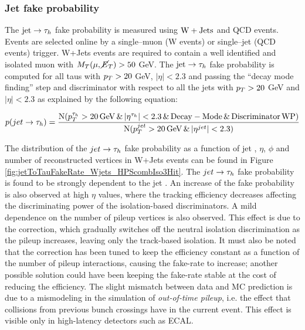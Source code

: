 \subsubsection{Jet fake probability}

The $\mathrm{jet} \rightarrow \tau_h$ fake probability is measured using $\mathrm{W}+\mathrm{Jets}$ and QCD events. Events are selected online by a single--muon (W events) or single--jet (QCD events) trigger. W+Jets events are required to contain a well identified and isolated muon with $M_T(\mu, \cancel{E}_T) > 50$ GeV. The $\mathrm{jet} \rightarrow \tau_h$ fake probability is computed for all taus with $p_{T} > 20$ GeV, $|\eta| < 2.3$ and passing the ``decay mode finding'' step and discriminator with respect to all the jets with $p_{T} > 20$ GeV and $|\eta| < 2.3$ as explained by the following equation:

\begin{equation}
 p(jet \rightarrow \tau_h) = \dfrac{\operatorname{N}(p_{T}^{\tau_h} > 20\, \mathrm{GeV} \, \& \, |\eta^{\tau_h}| < 2.3 \, \& \, \mathrm{Decay-Mode} \, \& \, \mathrm{Discriminator\,WP})}{\operatorname{N}(p_{T}^{jet} > 20\, \mathrm{GeV} \, \& \, |\eta^{jet}| < 2.3)}
\end{equation}

The distribution of the $jet \rightarrow \tau_h$ fake probability as a function of jet \pT, $\eta$, $\phi$ and number of reconstructed vertices in W+Jets events can be found in Figure \ref{fig:jetToTauFakeRate_Wjets_HPScombIso3Hit}. The $jet \rightarrow \tau_h$ fake probability is found to be strongly dependent to the jet \pT. An increase of the fake probability is also observed at high $\eta$ values, where the tracking efficiency decreases affecting the discriminating power of the isolation-based discriminators. A mild dependence on the number of pileup vertices is also observed. This effect is due to the \db correction, which gradually switches off the neutral isolation discrimination as the pileup increases, leaving only the track-based isolation. It must also be noted that the \db correction has been tuned to keep the efficiency constant as a function of the number of pileup interactions, causing the fake-rate to increase; another possible solution could have been keeping the fake-rate stable at the cost of reducing the efficiency. The slight mismatch between data and MC prediction is due to a mismodeling in the simulation of \emph{out-of-time pileup}, i.e. the effect that collisions from previous bunch crossings have in the current event. This effect is visible only in high-latency detectors such as ECAL.


